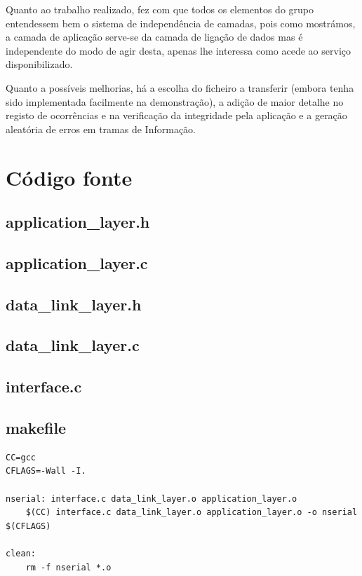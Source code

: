 \documentclass[11pt]{article}
\begin{document}
Quanto ao trabalho realizado, fez com que todos os elementos do grupo entendessem bem o sistema de independência de camadas, pois como mostrámos, a camada de aplicação serve-se da camada de ligação de dados mas é independente do modo de agir desta, apenas lhe interessa como acede ao serviço disponibilizado.

Quanto a possíveis melhorias, há a escolha do ficheiro a transferir (embora tenha sido implementada facilmente na demonstração), a adição de maior detalhe no registo de ocorrências e na verificação da integridade pela aplicação e a geração aleatória de erros em tramas de Informação.

\newpage
\appendix
\section{Código fonte}
\subsection{application\_layer.h}

\newpage
\subsection{application\_layer.c}

\newpage
\subsection{data\_link\_layer.h}

\newpage
\subsection{data\_link\_layer.c}

\newpage
\subsection{interface.c}

\newpage
\subsection{makefile}
\begin{lstlisting}
CC=gcc
CFLAGS=-Wall -I.

nserial: interface.c data_link_layer.o application_layer.o
	$(CC) interface.c data_link_layer.o application_layer.o -o nserial $(CFLAGS)

clean:
	rm -f nserial *.o
\end{lstlisting}
\end{document}
